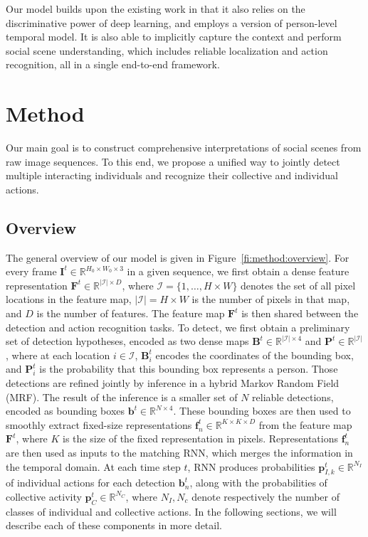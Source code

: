 \documentclass[10pt,twocolumn,letterpaper]{article}
\newcommand{\bF}[0]{\mathbf{F}}
\newcommand{\bP}[0]{\mathbf{P}}
\newcommand{\bB}[0]{\mathbf{B}}
\newcommand{\bI}[0]{\mathbf{I}}
\newcommand{\bb}[0]{\mathbf{b}}
\newcommand{\bp}[0]{\bm{p}}
\newcommand{\ff}[0]{\bm{f}}
\newcommand{\mR}[0]{\mathbb{R}}
\newcommand{\mI}[0]{\mathcal{I}}
\begin{document}
Our model builds upon the existing work in that it also relies on the
discriminative power of deep learning, and employs a version of person-level
temporal model. It is also able to implicitly capture the context and perform
social scene understanding, which includes reliable localization and action
recognition, all in a single end-to-end framework.
 \vspace{-0.1cm}
\section{Method}
\vspace{-0.15cm}

Our main goal is to construct comprehensive interpretations of social scenes
from raw image sequences. To this end, we propose a unified way to jointly detect multiple
interacting individuals and recognize their collective and individual actions.

\subsection{Overview}
\vspace{-0.15cm}

The general overview of our model is given in Figure~\ref{fi:method:overview}.
For every frame $\bI^t \in \mR^{H_0 \times W_0\times 3}$ in a given sequence, we first
obtain
a dense feature representation $\bF^t \in \mR^{|\mI|\times D}$, where $\mI = \{ 1,
\ldots, H \times W \}$ denotes the set of all pixel locations in the feature
map, $|\mI| = H \times W$ is the number of pixels in that map, and $D$ is the
number of features. The feature map $\bF^t$ is then shared between the
detection and action recognition tasks.
To detect, we first obtain a preliminary set of detection hypotheses,
encoded as two dense maps $\bB^t \in \mR^{|\mI|\times 4}$ and $\bP^t \in \mR^{|\mI|}$,
where at each location $i \in \mI$, $\bB^t_i$ encodes the coordinates of the bounding box,
and $\bP^t_i$ is the probability that this bounding box represents a person.
Those detections are refined jointly by inference in a hybrid Markov
Random Field (MRF). The result of the inference is a smaller set of $N$
reliable detections, encoded as bounding boxes $\bb^t \in \mR^{N \times 4}$. 
These bounding boxes are then used to smoothly extract
fixed-size representations $\ff^t_n \in \mR^{K\times K\times D}$ from the feature map
$\bF^t$, where $K$ is the size of the fixed representation in pixels. 
Representations $\ff^t_n$ are then used as inputs to the matching RNN, which 
merges the information in the temporal domain. At each time step $t$, RNN produces
probabilities $\bp^t_{I,k} \in \mR^{N_I}$ of individual actions for each detection 
$\bb^t_n$, along with the probabilities of collective activity 
$\bp^t_{C} \in \mR^{N_C}$, where
$N_I, N_c$ denote respectively the number of classes of individual and
collective actions. In the following sections, we will describe each of these
components in more detail. 
\end{document}
